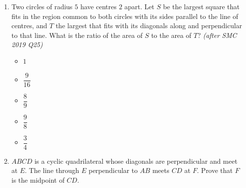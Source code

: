 \documentclass[11pt,a4paper]{article}
\begin{document}
\begin{enumerate}
\item \begin{minipage}[t]{0.60\linewidth}
Two circles of radius $5$ have centres $2$ apart. Let $S$ be the largest square that fits in the region common to both circles with its sides parallel to the line of centres, and $T$ the largest that fits with its diagonals along and perpendicular to that line. What is the ratio of the area of $S$ to the area of $T$? \textit{\small(after SMC 2019 Q25)}
\begin{itemize}[itemsep=3pt]
\item[A)] $1$
\item[B)] $\dfrac{9}{16}$
\item[C)] $\dfrac89$
\item[D)] $\dfrac98$
\item[E)] $\dfrac34$
\end{itemize}
\end{minipage}\hfill
\begin{minipage}[t]{0.36\linewidth}
\vspace{0pt}
\centering
{}
\end{minipage}

\item \begin{minipage}[t]{0.60\linewidth}
$ABCD$ is a cyclic quadrilateral whose diagonals are perpendicular and meet at $E$. The line through $E$ perpendicular to $AB$ meets $CD$ at $F$. Prove that $F$ is the midpoint of $CD$.
\end{minipage}\hfill
\begin{minipage}[t]{0.36\linewidth}
\vspace{0pt}
\centering
{}
\end{minipage}

\end{enumerate}

\end{document}
